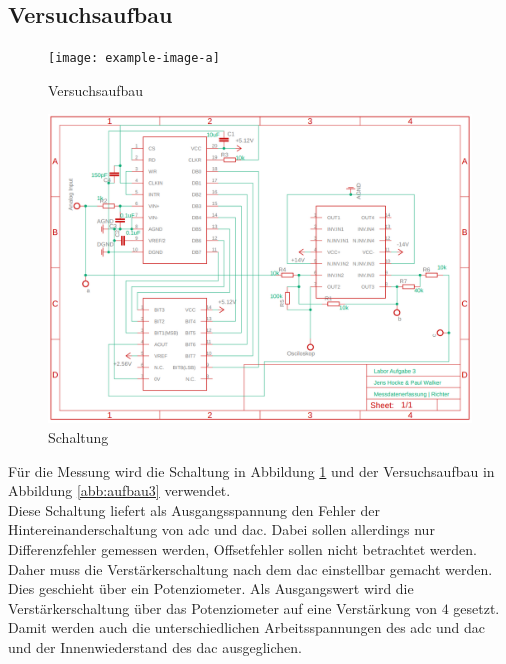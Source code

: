 \documentclass[12pt, a4paper, ngerman]{article}
\begin{document}
\subsection{Versuchsaufbau}

\begin{figure}%
  \centering
  \begin{minipage}[b]{0.49\textwidth} %
    \texttt{[image: example-image-a]}
    \caption{Versuchsaufbau}
    \label{abb:aufbau3}
  \end{minipage}
  \hfill
  \begin{minipage}[b]{0.49\textwidth}
    \includegraphics[width=\textwidth]{schaltplan_versuch_3.png}
    \caption{Schaltung}
    \label{abb:schaltung3}
  \end{minipage}
\end{figure}

Für die Messung wird die Schaltung in Abbildung \ref{abb:schaltung3}
und der Versuchsaufbau in Abbildung \ref{abb:aufbau3} verwendet. \\
Diese Schaltung liefert als Ausgangsspannung den Fehler
der Hintereinanderschaltung von \ac{adc} und \ac{dac}.
Dabei sollen allerdings nur Differenzfehler gemessen werden,
Offsetfehler sollen nicht betrachtet werden.
Daher muss die Verstärkerschaltung nach dem \ac{dac} einstellbar gemacht werden.
Dies geschieht über ein Potenziometer.
Als Ausgangswert wird die Verstärkerschaltung über das Potenziometer auf eine Verstärkung von $4$ gesetzt.
Damit werden auch die unterschiedlichen Arbeitsspannungen des \ac{adc} und \ac{dac} und der Innenwiederstand des \ac{dac} ausgeglichen.
\end{document}
